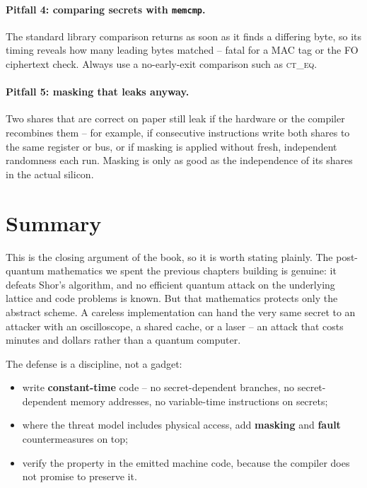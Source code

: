\paragraph{Pitfall 4: comparing secrets with \texttt{memcmp}.}
The standard library comparison returns as soon as it finds a differing byte, so its
timing reveals how many leading bytes matched -- fatal for a MAC tag or the FO
ciphertext check. Always use a no-early-exit comparison such as \textsc{ct\_eq}.

\paragraph{Pitfall 5: masking that leaks anyway.}
Two shares that are correct on paper still leak if the hardware or the compiler
recombines them -- for example, if consecutive instructions write both shares to the
same register or bus, or if masking is applied without fresh, independent randomness
each run. Masking is only as good as the independence of its shares in the actual
silicon.

\section{Summary}

This is the closing argument of the book, so it is worth stating plainly. The
post-quantum mathematics we spent the previous chapters building is genuine: it
defeats Shor's algorithm, and no efficient quantum attack on the underlying lattice
and code problems is known. But that mathematics protects only the abstract scheme. A
careless implementation can hand the very same secret to an attacker with an
oscilloscope, a shared cache, or a laser -- an attack that costs minutes and dollars
rather than a quantum computer.

The defense is a discipline, not a gadget:

\begin{itemize}
  \item write \textbf{constant-time} code -- no secret-dependent branches, no
        secret-dependent memory addresses, no variable-time instructions on secrets;
  \item where the threat model includes physical access, add \textbf{masking} and
        \textbf{fault} countermeasures on top;
  \item verify the property in the emitted machine code, because the compiler does not
        promise to preserve it.
\end{itemize}

